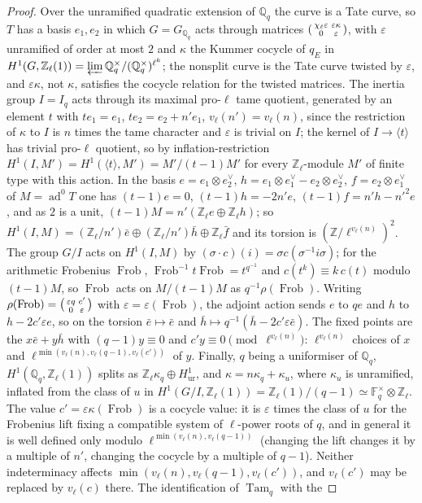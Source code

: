 \documentclass[11pt]{amsart}
\theoremstyle{definition}
\newcommand{\Q}{\mathbb{Q}}
\newcommand{\Z}{\mathbb{Z}}
\newcommand{\F}{\mathbb{F}}
\newcommand{\ad}{\operatorname{ad}^0}
\newcommand{\Frob}{\operatorname{Frob}}
\newcommand{\Tam}{\operatorname{Tam}}
\begin{document}
\begin{proof}
Over the unramified quadratic extension of $\Q_q$ the curve is a Tate curve, so $T$ has a basis $e_1,e_2$ in which $G=G_{\Q_q}$ acts through matrices $\begin{psmallmatrix}\chi_\ell\varepsilon&\varepsilon\kappa\\0&\varepsilon\end{psmallmatrix}$, with $\varepsilon$ unramified of order at most $2$ and $\kappa$ the Kummer cocycle of $q_E$ in $H^1(G,\Z_\ell(1))=\varprojlim\Q_q^\times/(\Q_q^\times)^{\ell^k}$; the nonsplit curve is the Tate curve twisted by $\varepsilon$, and $\varepsilon\kappa$, not $\kappa$, satisfies the cocycle relation for the twisted matrices. The inertia group $I=I_q$ acts through its maximal pro-$\ell$ tame quotient, generated by an element $t$ with $te_1=e_1$, $te_2=e_2+n'e_1$, $v_\ell(n')=v_\ell(n)$, since the restriction of $\kappa$ to $I$ is $n$ times the tame character and $\varepsilon$ is trivial on $I$; the kernel of $I\to\langle t\rangle$ has trivial pro-$\ell$ quotient, so by inflation-restriction $H^1(I,M')=H^1(\langle t\rangle,M')=M'/(t-1)M'$ for every $\Z_\ell$-module $M'$ of finite type with this action. In the basis $e=e_1\otimes e_2^\vee$, $h=e_1\otimes e_1^\vee-e_2\otimes e_2^\vee$, $f=e_2\otimes e_1^\vee$ of $M=\ad T$ one has $(t-1)e=0$, $(t-1)h=-2n'e$, $(t-1)f=n'h-n'^2e$, and as $2$ is a unit, $(t-1)M=n'(\Z_\ell e\oplus\Z_\ell h)$; so $H^1(I,M)=(\Z_\ell/n')\bar e\oplus(\Z_\ell/n')\bar h\oplus\Z_\ell\bar f$ and its torsion is $(\Z/\ell^{v_\ell(n)})^2$. The group $G/I$ acts on $H^1(I,M)$ by $(\sigma\cdot c)(i)=\sigma c(\sigma^{-1}i\sigma)$; for the arithmetic Frobenius $\Frob$, $\Frob^{-1}t\Frob=t^{q^{-1}}$ and $c(t^k)\equiv k\,c(t)$ modulo $(t-1)M$, so $\Frob$ acts on $M/(t-1)M$ as $q^{-1}\rho(\Frob)$. Writing $\rho(\Frob)=\begin{psmallmatrix}\varepsilon q&c'\\0&\varepsilon\end{psmallmatrix}$ with $\varepsilon=\varepsilon(\Frob)$, the adjoint action sends $e$ to $qe$ and $h$ to $h-2c'\varepsilon e$, so on the torsion $\bar e\mapsto\bar e$ and $\bar h\mapsto q^{-1}(\bar h-2c'\varepsilon\bar e)$. The fixed points are the $x\bar e+y\bar h$ with $(q-1)y\equiv0$ and $c'y\equiv0\pmod{\ell^{v_\ell(n)}}$: $\ell^{v_\ell(n)}$ choices of $x$ and $\ell^{\min(v_\ell(n),v_\ell(q-1),v_\ell(c'))}$ of $y$. Finally, $q$ being a uniformiser of $\Q_q$, $H^1(\Q_q,\Z_\ell(1))$ splits as $\Z_\ell\kappa_q\oplus H^1_{\mathrm{ur}}$, and $\kappa=n\kappa_q+\kappa_u$, where $\kappa_u$ is unramified, inflated from the class of $u$ in $H^1(G/I,\Z_\ell(1))=\Z_\ell(1)/(q-1)\simeq\F_q^\times\otimes\Z_\ell$. The value $c'=\varepsilon\kappa(\Frob)$ is a cocycle value: it is $\varepsilon$ times the class of $u$ for the Frobenius lift fixing a compatible system of $\ell$-power roots of $q$, and in general it is well defined only modulo $\ell^{\min(v_\ell(n),v_\ell(q-1))}$ (changing the lift changes it by a multiple of $n'$, changing the cocycle by a multiple of $q-1$). Neither indeterminacy affects $\min(v_\ell(n),v_\ell(q-1),v_\ell(c'))$, and $v_\ell(c')$ may be replaced by $v_\ell(c)$ there. The identification of $\Tam_q$ with the 
\end{proof}
\end{document}
